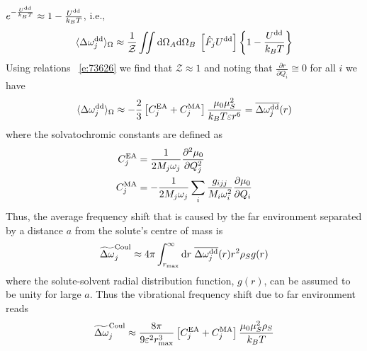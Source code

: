 \documentclass[b5paper,oneside,fleqn,11pt]{book}
\newcommand{\fderiv}[2]{\ensuremath{
    \frac{\partial #1}{\partial #2}}}
\newcommand{\sderiv}[2]{\ensuremath{
    \frac{\partial^2 #1}{\partial #2^2}
    }}
\begin{document}
\begin{refsection}
$e^{-\frac{U^{\rm dd}}{k_BT}}\approx 1 -\frac{U^{\rm dd}}{k_BT}$, i.e.,
%
\begin{equation}
 \langle \Delta \omega_j^{\rm dd} \rangle_{\Omega} \approx 
\frac{1}{\mathcal{Z}} 
\iint {\rm d}\Omega_A{\rm d}\Omega_B \; \left[\hat{F}_j U^{\rm dd}\right]
\left\{ 1 - \frac{U^{\rm dd}}{k_BT}\right\}
\end{equation}
%
Using relations ~\eqref{e:73626} we find that $\mathcal{Z}\approx1$
and noting that $\fderiv{r}{Q_i} \cong 0$ for all $i$ we have
%
\begin{equation}
 \langle \Delta \omega_j^{\rm dd} \rangle_{\Omega} \approx 
-\frac{2}{3} \left[ C^{\rm EA}_j + C^{\rm MA}_j \right] \frac{\mu_0\mu_S^2}{k_BT\varepsilon r^6} 
= \overline{\Delta \omega_j^{\rm dd}}(r)
\end{equation}
%
where the solvatochromic constants are defined as
%
\begin{subequations}
\begin{align}
 C^{\rm EA}_j &= \frac{1}{2M_j\omega_j} \sderiv{\mu_0}{Q_j} \\
 C^{\rm MA}_j &=-\frac{1}{2M_j\omega_j} \sum_i \frac{g_{ijj}}{M_i\omega_i^2} \fderiv{\mu_0}{Q_i}
\end{align}
\end{subequations}
%
Thus, the average frequency shift that is caused
by the far environment separated by a distance $a$
from the solute's centre of mass is
%
\begin{equation}
\widetilde{\Delta \omega}_j^{\rm Coul} \approx
4\pi \int_{r_{\rm max}}^{\infty} {\rm d}r \; \overline{\Delta \omega_j^{\rm dd}}(r) r^2 \rho_S g(r)
\end{equation}
%
where the solute\hyp{}solvent radial distribution function, $g(r)$, 
can be assumed to be unity for large $a$. Thus the vibrational
frequency shift due to far environment reads
%
\begin{equation} \label{e:x123}
  \widetilde{\Delta \omega}_j^{\rm Coul}  \approx 
\frac{8\pi}{9\varepsilon^2 r_{\rm max}^3} \left[ C^{\rm EA}_j + C^{\rm MA}_j \right] \frac{\mu_0\mu_S^2\rho_S}{k_BT} 
\end{equation}
%
%

\end{refsection}
\end{document}
